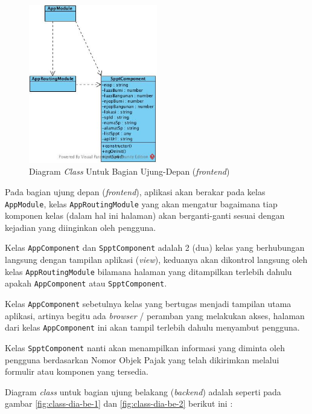 \begin{figure}[H]
	\centering
	\includegraphics[width=0.5\textwidth]{./resources/uml/class-diagram-fe}
	\caption{Diagram \textit{Class} Untuk Bagian Ujung-Depan (\textit{frontend})}
	\label{fig:class-dia-fe}
\end{figure}

Pada bagian ujung depan (\textit{frontend}), aplikasi akan berakar pada kelas \texttt{AppModule}, kelas \texttt{AppRoutingModule} yang akan mengatur bagaimana tiap komponen kelas (dalam hal ini halaman) akan berganti-ganti sesuai dengan kejadian yang diinginkan oleh pengguna.

Kelas \texttt{AppComponent} dan \texttt{SpptComponent} adalah 2 (dua) kelas yang berhubungan langsung dengan tampilan aplikasi (\textit{view}), keduanya akan dikontrol langsung oleh kelas \texttt{AppRoutingModule} bilamana halaman yang ditampilkan terlebih dahulu apakah \texttt{AppComponent} atau \texttt{SpptComponent}.

Kelas \texttt{AppComponent} sebetulnya kelas yang bertugas menjadi tampilan utama aplikasi, artinya begitu ada \textit{browser} / peramban yang melakukan akses, halaman dari kelas \texttt{AppComponent} ini akan tampil terlebih dahulu menyambut pengguna.

Kelas \texttt{SpptComponent} nanti akan menampilkan informasi yang diminta oleh pengguna berdasarkan Nomor Objek Pajak yang telah dikirimkan melalui formulir atau komponen yang tersedia.

Diagram \textit{class} untuk bagian ujung belakang (\textit{backend}) adalah seperti pada gambar \ref{fig:class-dia-be-1} dan \ref{fig:class-dia-be-2} berikut ini :

